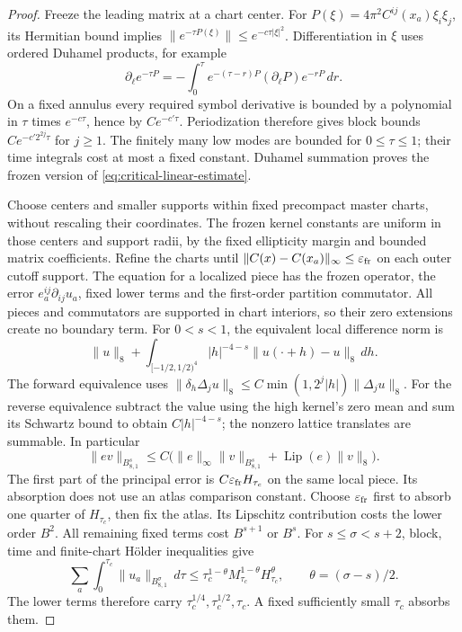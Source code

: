 \documentclass[11pt]{article}
\numberwithin{equation}{section}
\theoremstyle{definition}
\theoremstyle{remark}
\begin{document}
\begin{proof}
Freeze the leading matrix at a chart center.
For $P(\xi)=4\pi^2C^{ij}(x_a)\xi_i\xi_j$, its
Hermitian bound implies
$\|e^{-\tau P(\xi)}\|\le e^{-c\tau|\xi|^2}$.
Differentiation in $\xi$ uses ordered Duhamel products,
for example
\[
 \partial_\ell e^{-\tau P}
 =-\int_0^\tau e^{-(\tau-r)P}
                  (\partial_\ell P)e^{-rP}\,dr .
\]
On a fixed annulus every required symbol derivative
is bounded by a polynomial in $\tau$ times
$e^{-c\tau}$, hence by $Ce^{-c'\tau}$.
Periodization therefore gives block bounds
$Ce^{-c'2^{2j}\tau}$ for $j\ge1$.
The finitely many low modes are bounded for
$0\le\tau\le1$; their time integrals cost at most a
fixed constant. Duhamel summation proves the frozen
version of \eqref{eq:critical-linear-estimate}.

Choose centers and smaller supports within fixed
precompact master charts, without rescaling their
coordinates. The frozen kernel constants are uniform
in those centers and support radii, by the fixed
ellipticity margin and bounded matrix coefficients.
Refine the charts until
$\|C(x)-C(x_a)\|_\infty\le\varepsilon_{\rm fr}$ on each outer
cutoff support. The equation for a localized piece
has the frozen operator, the error
$e_a^{ij}\partial_{ij}u_a$, fixed lower terms and
the first-order partition commutator.
All pieces and commutators are supported in chart
interiors, so their zero extensions create no boundary
term. For $0<s<1$, the equivalent local difference norm is
\[
 \|u\|_8+
 \int_{[-1/2,1/2)^4}|h|^{-4-s}
                          \|u(\cdot+h)-u\|_8\,dh .
\]
The forward equivalence uses
$\|\delta_h\Delta_ju\|_8
\le C\min(1,2^j|h|)\|\Delta_ju\|_8$.
For the reverse equivalence subtract the value using
the high kernel's zero mean and sum its Schwartz
bound to obtain $C|h|^{-4-s}$; the nonzero lattice
translates are summable. In particular
\[
 \|ev\|_{B^s_{8,1}}
 \le C\bigl(\|e\|_\infty\|v\|_{B^s_{8,1}}
                          +\operatorname{Lip}(e)\|v\|_8\bigr).
\]
The first part of the principal error is
$C\varepsilon_{\rm fr}H_{\tau_c}$ on the same local piece.
Its absorption does not use an atlas comparison
constant. Choose $\varepsilon_{\rm fr}$ first to absorb one
quarter of $H_{\tau_c}$, then fix the atlas.
Its Lipschitz contribution costs the lower order $B^2$.
All remaining fixed terms cost $B^{s+1}$ or $B^s$.
For $s\le\sigma<s+2$, block, time and finite-chart
H\"older inequalities give
\[
 \sum_a\int_0^{\tau_c}\|u_a\|_{B^\sigma_{8,1}}\,d\tau
 \le \tau_c^{1-\theta}M_{\tau_c}^{1-\theta}
                       H_{\tau_c}^{\theta},
 \qquad \theta=(\sigma-s)/2 .
\]
The lower terms therefore carry
$\tau_c^{1/4},\tau_c^{1/2},\tau_c$.
A fixed sufficiently small $\tau_c$ absorbs them.


\end{proof}
\end{document}
